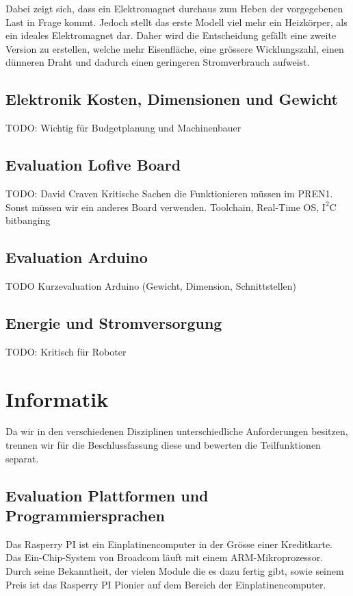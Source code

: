 \documentclass[a4paper]{report}
\begin{document}
Dabei zeigt sich, dass ein Elektromagnet durchaus zum Heben der vorgegebenen Last in Frage kommt. Jedoch stellt das erste Modell viel mehr ein Heizkörper, als ein ideales Elektromagnet dar.
Daher wird die Entscheidung gefällt eine zweite Version zu erstellen, welche mehr Eisenfläche, eine grössere Wicklungszahl, einen dünneren Draht und dadurch einen geringeren Stromverbrauch aufweist.

\subsection{Elektronik Kosten, Dimensionen und Gewicht}
TODO: Wichtig für Budgetplanung und Machinenbauer

\subsection{Evaluation Lofive Board}
TODO: David Craven
Kritische Sachen die Funktionieren müssen im PREN1. Sonst müssen wir ein anderes
Board verwenden.
Toolchain, Real-Time OS, $\text{I}^2\text{C}$ bitbanging

\subsection{Evaluation Arduino}
TODO Kurzevaluation Arduino (Gewicht, Dimension, Schnittstellen)

\subsection{Energie und Stromversorgung}
TODO: Kritisch für Roboter

\section{Informatik}
Da wir in den verschiedenen Disziplinen unterschiedliche Anforderungen besitzen, trennen wir für die Beschlussfassung diese und bewerten die Teilfunktionen separat.

\subsection{Evaluation Plattformen und Programmiersprachen}

Das Rasperry PI ist ein Einplatinencomputer in der Grösse einer
Kreditkarte. Das Ein-Chip-System von Broadcom läuft mit einem ARM-Mikroprozessor.
Durch seine Bekanntheit, der vielen Module die es dazu fertig gibt, sowie seinem Preis ist das Rasperry PI Pionier auf dem Bereich der Einplatinencomputer.
\end{document}
